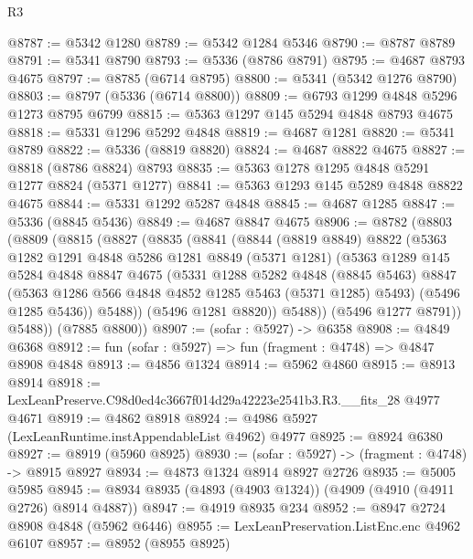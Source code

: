 \begin{lexlean}{R3}
\begin{coremodule}
@8787 := @5342 @1280
@8789 := @5342 @1284 @5346
@8790 := @8787 @8789
@8791 := @5341 @8790
@8793 := @5336 (@8786 @8791)
@8795 := @4687 @8793 @4675
@8797 := @8785 (@6714 @8795)
@8800 := @5341 (@5342 @1276 @8790)
@8803 := @8797 (@5336 (@6714 @8800))
@8809 := @6793 @1299 @4848 @5296 @1273 @8795 @6799
@8815 := @5363 @1297 @145 @5294 @4848 @8793 @4675
@8818 := @5331 @1296 @5292 @4848
@8819 := @4687 @1281
@8820 := @5341 @8789
@8822 := @5336 (@8819 @8820)
@8824 := @4687 @8822 @4675
@8827 := @8818 (@8786 @8824) @8793
@8835 := @5363 @1278 @1295 @4848 @5291 @1277 @8824 (@5371 @1277)
@8841 := @5363 @1293 @145 @5289 @4848 @8822 @4675
@8844 := @5331 @1292 @5287 @4848
@8845 := @4687 @1285
@8847 := @5336 (@8845 @5436)
@8849 := @4687 @8847 @4675
@8906 := @8782
    (@8803
      (@8809
        (@8815
          (@8827
            (@8835
              (@8841
                (@8844
                  (@8819 @8849)
                  @8822
                  (@5363
                    @1282
                    @1291
                    @4848
                    @5286
                    @1281
                    @8849
                    (@5371 @1281)
                    (@5363
                      @1289
                      @145
                      @5284
                      @4848
                      @8847
                      @4675
                      (@5331
                        @1288
                        @5282
                        @4848
                        (@8845 @5463)
                        @8847
                        (@5363 @1286 @566 @4848 @4852 @1285 @5463 (@5371 @1285) @5493)
                        (@5496 @1285 @5436))
                      @5488))
                  (@5496 @1281 @8820))
                @5488))
            (@5496 @1277 @8791))
          @5488))
      (@7885 @8800))
@8907 := (sofar : @5927) -> @6358
@8908 := @4849 @6368
@8912 := fun (sofar : @5927) => fun (fragment : @4748) => @4847 @8908 @4848
@8913 := @4856 @1324
@8914 := @5962 @4860
@8915 := @8913 @8914
@8918 := LexLeanPreserve.C98d0ed4c3667f014d29a42223e2541b3.R3.__fits_28 @4977 @4671
@8919 := @4862 @8918
@8924 := @4986 @5927 (LexLeanRuntime.instAppendableList @4962) @4977
@8925 := @8924 @6380
@8927 := @8919 (@5960 @8925)
@8930 := (sofar : @5927) -> (fragment : @4748) -> @8915 @8927
@8934 := @4873 @1324 @8914 @8927 @2726
@8935 := @5005 @5985
@8945 := @8934 @8935 (@4893 (@4903 @1324)) (@4909 (@4910 (@4911 @2726) @8914 @4887))
@8947 := @4919 @8935 @234
@8952 := @8947 @2724 @8908 @4848 (@5962 @6446)
@8955 := LexLeanPreservation.ListEnc.enc @4962 @6107
@8957 := @8952 (@8955 @8925)

\end{coremodule}
\end{lexlean}
